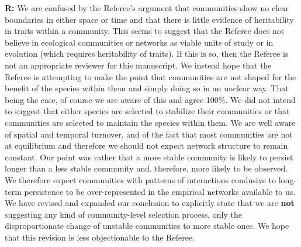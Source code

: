 \documentclass[12pt]{letter}
\begin{document}
      \textbf{R:} We are confused by the Referee's argument that communities show no clear boundaries in either space or time and that there is little evidence of heritability in traits within a community. This seems to suggest that the Referee does not believe in ecological communities or networks as viable units of study or in evolution (which requires heritability of traits). If this is so, then the Referee is not an appropriate reviewer for this manuscript. We instead hope that the Referee is attempting to make the point that communities are not shaped for the benefit of the species within them and simply doing so in an unclear way. That being the case, of course we are aware of this and agree 100\%. We did not intend to suggest that either species are selected to stabilize their communities or that communities are selected to maintain the species within them. We are well aware of spatial and temporal turnover, and of the fact that most communities are not at equilibrium and therefore we should not expect network structure to remain constant. Our point was rather that a more stable community is likely to persist longer than a less stable community and, therefore, more likely to be observed. We therefore expect communities with patterns of interactions condusive to long-term persistence to be over-represented in the empirical networks available to us. We have revised and expanded our conclusion to explicitly state that we are \textbf{not} suggesting any kind of community-level selection process, only the disproportionate change of unstable communities to more stable ones. We hope that this revision is less objectionable to the Referee.
\end{document}
